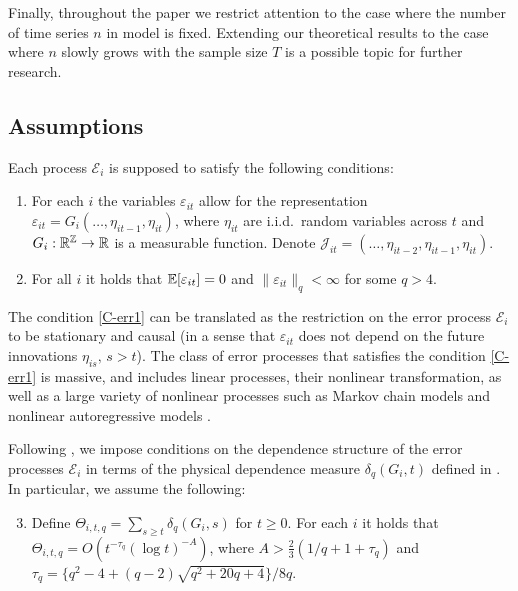 \documentclass[a4paper,12pt]{article}
\makeatletter
\renewcommand{\eqref}[1]{\tagform@{\ref{#1}}}
\makeatother
\begin{document}
Finally, throughout the paper we restrict attention to the case where the number of time series $n$ in model \eqref{eq:model_full} is fixed. Extending our theoretical results to the case where $n$ slowly grows with the sample size $T$ is a possible topic for further research.

\subsection{Assumptions}\label{subsec:model_assumptions}

Each process $\mathcal{E}_i$ is supposed to satisfy the following conditions: 

\begin{enumerate}[label=(C\arabic*),leftmargin=1.05cm]

\item \label{C-err1} For each $i$ the variables $\varepsilon_{it}$ allow for the representation $\varepsilon_{it} = G_i(\ldots,\eta_{it-1},\eta_{it})$, where $\eta_{it}$ are i.i.d.\ random variables across $t$ and $G_i: \mathbb{R}^{\mathbb{Z}} \rightarrow \mathbb{R}$ is a measurable function. Denote $\mathcal{J}_{it} = (\ldots,\eta_{it-2},\eta_{it-1},\eta_{it})$.

\item \label{C-err2} For all $i$ it holds that $\mathbb{E}[\varepsilon_{it}] =0$ and $\| \varepsilon_{it} \|_q < \infty$ for some $q > 4$.
\end{enumerate}
The condition \ref{C-err1} can be translated as the restriction on the error process $\mathcal{E}_i$ to be stationary and causal (in a sense that $\varepsilon_{it}$ does not depend on the future innovations $\eta_{is},\, s >t$). The class of error processes that satisfies the condition \ref{C-err1} is massive, and includes linear processes, their nonlinear transformation, as well as a large variety of nonlinear processes such as Markov chain models and nonlinear autoregressive models \citep[][]{Wu2016}.

Following \cite{Wu2005}, we impose conditions on the dependence structure of the error processes $\mathcal{E}_i$ in terms of the physical dependence measure $\delta_q(G_i, t)$ defined in \eqref{eq:physical_dep}. In particular, we assume the following: 
\begin{enumerate}[label=(C\arabic*),leftmargin=1.05cm]
\setcounter{enumi}{2}

\item \label{C-err3} Define $\Theta_{i, t,q} = \sum\nolimits_{s \ge t} \delta_q(G_i, s)$ for $t \ge 0$. For each $i$ it holds that \linebreak
$\Theta_{i, t,q} = O ( t^{-\tau_q} (\log t)^{-A} )$,  
where $A > \frac{2}{3} (1/q + 1 + \tau_q)$ and \linebreak $\tau_q = \{q^2 - 4 + (q-2) \sqrt{q^2 + 20q + 4}\} / 8q$. 

\end{enumerate}
\end{document}

